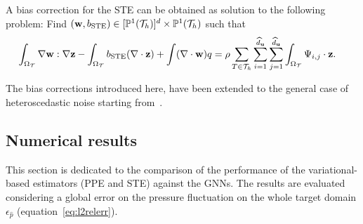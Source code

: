 A bias correction for the STE can be obtained as solution to the following problem: Find $(\mathbf{w},b_{\text{STE}}) \in[\mathbb{P}^1(\mathcal{T}_h)]^d \times \mathbb{P}^1(\mathcal{T}_h)$ such that 
  \begin{equation}\label{eq:ste-bias}
    \begin{aligned}
    \int_{\Omega_{\mathcal T}} \nabla\mathbf{w}:\nabla\mathbf{z} &- \int_{\Omega_{\mathcal T}} b_{\text{STE}}(\nabla\cdot\mathbf{z})+\int(\nabla\cdot\mathbf{w})q =\rho\sum_{T\in\mathcal{T}_h}\sum_{i=1}^{\widehat{d}_{\mathbf u}}\sum_{j=1}^{\widehat{d}_{\mathbf u}}\int_{\Omega_{\mathcal T}} \Psi_{i,j} \cdot\mathbf{z}.
   \end{aligned}
    \end{equation}

The bias corrections introduced here, have been extended to the general case of heteroscedastic noise starting from~\cite{bertoglio2018relative}.

\subsection{Numerical results}
\label{subsec:resultspressureestimators}
This section is dedicated to the comparison of the performance of the variational-based estimators (PPE and STE)
against the GNNs. The results are evaluated considering a global error on the pressure fluctuation on the whole target domain $\epsilon_{\widehat{p}}$ (equation~\eqref{eq:l2relerr}).

